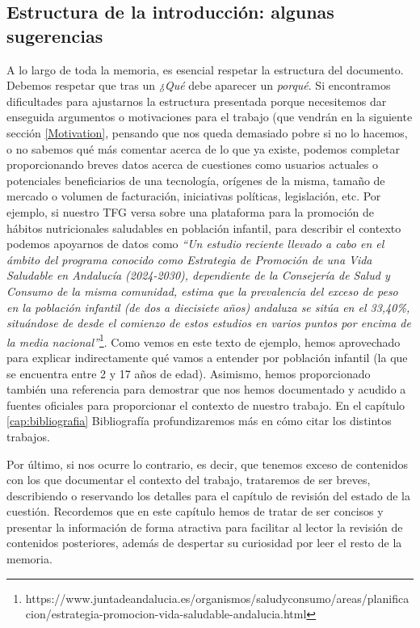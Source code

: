 \subsection{Estructura de la introducción: algunas sugerencias}
A lo largo de toda la memoria, es esencial respetar la estructura del documento. Debemos respetar que tras un \textit{¿Qué} debe aparecer un \textit{porqué}.
Si encontramos dificultades para ajustarnos la estructura presentada porque necesitemos dar enseguida argumentos o motivaciones para el trabajo (que vendrán en la siguiente sección \ref{Motivation}, pensando que nos queda demasiado pobre si no lo hacemos, o no sabemos qué más comentar acerca de lo que ya existe, podemos completar proporcionando breves datos acerca de cuestiones como usuarios actuales o potenciales beneficiarios de una tecnología, orígenes de la misma, tamaño de mercado o volumen de facturación, iniciativas políticas, legislación, etc. Por ejemplo, si nuestro TFG versa sobre una plataforma para la promoción de hábitos nutricionales saludables en población infantil, para describir el contexto podemos apoyarnos de datos como \textit{``Un estudio reciente llevado a cabo en el ámbito del programa conocido como Estrategia de Promoción de una Vida Saludable en Andalucía (2024-2030), dependiente de la Consejería de Salud y Consumo de la misma comunidad, estima que la prevalencia del exceso de peso en la población infantil (de dos a diecisiete años) andaluza se sitúa en el 33,40\%, situándose de desde el comienzo de estos estudios en varios puntos por encima de la media nacional''}\footnote{https://www.juntadeandalucia.es/organismos/saludyconsumo/areas/planificacion/estrategia-promocion-vida-saludable-andalucia.html}. Como vemos en este texto de ejemplo, hemos aprovechado para explicar indirectamente qué vamos a entender por población infantil (la que se encuentra entre 2 y 17 años de edad). Asimismo, hemos proporcionado también una referencia para demostrar que nos hemos documentado y acudido a fuentes oficiales para proporcionar el contexto de nuestro trabajo. En el capítulo  \ref{cap:bibliografia} Bibliografía profundizaremos más en cómo citar los distintos trabajos.

Por último, si nos ocurre lo contrario, es decir, que tenemos exceso de contenidos con los que documentar el contexto del trabajo, trataremos de ser breves, describiendo o reservando los detalles para el capítulo de revisión del estado de la cuestión. Recordemos que en este capítulo hemos de tratar de ser concisos y presentar la información de forma atractiva para facilitar al lector la revisión de contenidos posteriores, además de despertar su curiosidad por leer el resto de la memoria.

